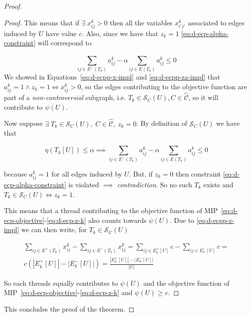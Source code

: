 \begin{proof}
\begin{proof}
		This means that if $\exists \; x_{ij}^{k} > 0$ then all the variables
		$x_{i'j'}^{k}$ associated to edges induced by $U$ have value $c$.
		Also, since we have that $z_k = 1$ \autoref{eq:d-ecp-alpha-constraint}
		will correspond to

		\begin{equation}
			\sum^{}_{ij \in E^{-} (T_k)} a_{ij}^{k}  - \alpha \sum^{}_{ij \in E(T_k)}
			a_{ij} ^{k} \leq 0
		\end{equation}
		We showed in Equations~\ref{eq:d-ecpp-x-impl} and \autoref{eq:d-ecpp-za-impl} that $a_{ij}^{k} = 1 \land z_k
			= 1 \iff x_{ij}^{k} > 0 $, so the edges contributing to the objective
		function are part of a \emph{non-controversial} subgraph, i.e. $T_k \in
			\mathcal{S}_C(U), C \in \mathcal{\hat{C}}$, so it will contribute to $\psi(U)$.

		Now suppose $\exists \; T_k \in \mathcal{S}_C(U), \; C \in \mathcal{\hat{C}},
			\; z_k = 0$. By definition of $\mathcal{S}_C(U)$ we have that

		\begin{equation}
			\eta(T_k[U]) \leq \alpha  \implies \sum^{}_{ij \in E^{-} (T_k)} a_{ij}^{k}  - \alpha \sum^{}_{ij \in E(T_k)}
			a_{ij} ^{k} \leq 0
		\end{equation}

		because $a_{ij}^{k} = 1$ for all edges induced by $U$. But, if $z_k =
			0$ then constraint \ref{eq:d-ecp-alpha-constraint} is violated
		$\implies $ \emph{contradiction}. So no such $T_k$ exists and $T_k
			\in \mathcal{S}_C(U) \iff z_k = 1$.

		This means that a thread contributing to the objective function of
		MIP~\ref{eq:d-ecp-objective}-\ref{eq:d-ecp-z-k} also counts towards
		$\psi(U)$. Due to \autoref{eq:d-ecpp-z-impl} we can then write, for
		$T_k \in \mathcal{S}_C(U)$

		\begin{multline*}
			\sum^{}_{ij \in E^{+} (T_{k})} x_{ij} ^{k} - \sum_{ij \in E^{-}
				(T_{k})} x_{ij} ^{k} = \sum^{}_{ij \in E^{+}_k[U] } c - \sum_{ij \in E^{-}
			_k[U]} c = \\ c (|E^{+}_{k}[U]| - |E^{-}_{k}[U]|) =
			\frac{|E^{+}_{k}[U]| - |E^{-}_{k}[U]|}{|U|}
		\end{multline*}

		So each threads equally contributes to $\psi(U)$ and the objective
		function of MIP~\ref{eq:d-ecp-objective}-\ref{eq:d-ecp-z-k} and
		$\psi(U) \geq v$.
	\end{proof}

	This concludes the proof of the theorem.

\end{proof}

